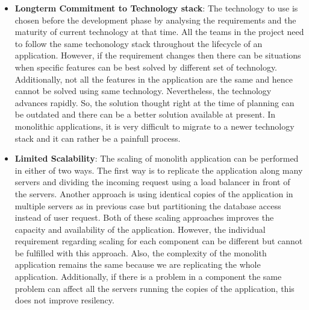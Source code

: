 \begin{enumerate}
\begin{itemize}[leftmargin=.5in]
\\
\item \textbf{Longterm Commitment to Technology stack}: The technology to use is chosen before the development phase by analysing the requirements and the maturity of current technology at that time. All the teams in the project need to follow the same techonology stack throughout the lifecycle of an application. However, if the requirement changes then there can be situations when specific features can be best solved by different set of technology. Additionally, not all the features in the application are the same and hence cannot be solved using same technology. Nevertheless, the technology advances rapidly. So, the solution thought right at the time of planning can be outdated and there can be a better solution available at present. In monolithic applications, it is very difficult to migrate to a newer technology stack and it can rather be a painfull process.
\\
\item \textbf{Limited Scalability}: The scaling of monolith application can be performed in either of two ways. The first way is to replicate the application along many servers and dividing the incoming request using a load balancer in front of the servers. Another approach is using identical copies of the application in multiple servers as in previous case but partitioning the database access instead of user request. Both of these scaling approaches improves the capacity and availability of the application. However, the individual requirement regarding scaling for each component can be different but cannot be fulfilled with this approach. Also, the complexity of the monolith application remains the same because we are replicating the whole application. Additionally, if there is a problem in a component the same problem can affect all the servers running the copies of the application, this does not improve resilency.\cite{MacVittie:2014aa}\cite{Namiot:2014aa}
\end{itemize}
\\


\end{enumerate}
